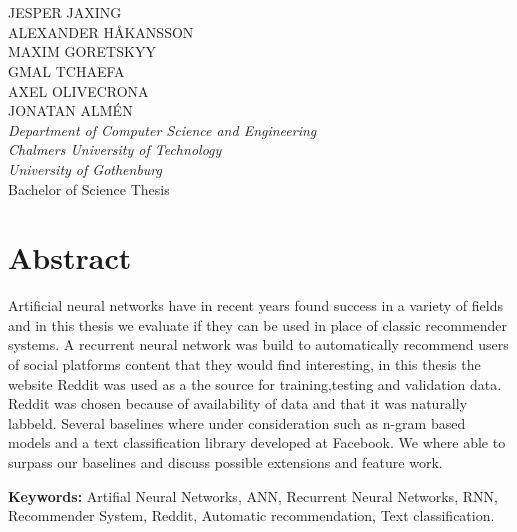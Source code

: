 \large
\begin{flushleft}
\textbf{\varthetitle}\\
\varthesubtitle\\[0.7cm]
\end{flushleft}
JESPER JAXING\\
ALEXANDER HÅKANSSON\\
MAXIM GORETSKYY\\
GMAL TCHAEFA\\
AXEL OLIVECRONA\\
JONATAN ALMÉN\\
\normalsize
\textit{Department of Computer Science and Engineering\\
Chalmers University of Technology\\
University of Gothenburg}\\[0.7cm]
Bachelor of Science Thesis
\setlength{\parskip}{0.5cm}

\thispagestyle{plain}			%
\setlength{\parskip}{0pt plus 1.0pt}
\section*{Abstract}
Artificial neural networks have in recent years found success in a variety of fields and in this thesis we evaluate if they can be used in place of classic recommender systems. A recurrent neural network was build to automatically recommend users of social platforms content that they would find interesting, in this thesis the website Reddit was used as a the source for training,testing and validation data. Reddit was chosen because of availability of data and that it was naturally labbeld. Several baselines where under consideration such as n-gram based models and a text classification library developed at Facebook. We where able to surpass our baselines and discuss possible extensions and feature work. 

\vfill
\textbf{Keywords:} Artifial Neural Networks, ANN, Recurrent Neural Networks, RNN, Recommender System, Reddit, Automatic recommendation, Text classification.

\newpage				%
\thispagestyle{empty}
\mbox{}
